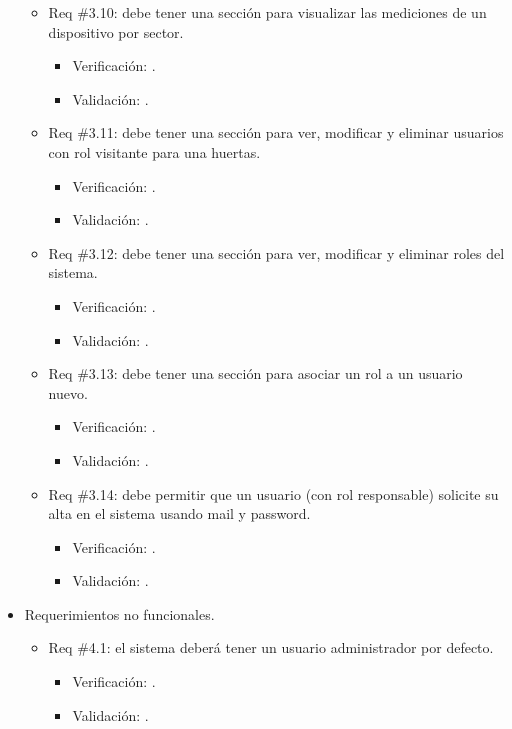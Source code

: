 \documentclass[
11pt, %
codirector, %
]{charter}
\begin{document}
\begin{itemize}
\begin{itemize}
	\item Req \#3.10: debe tener una sección para visualizar las mediciones de un dispositivo por sector.
		\begin{itemize}
		\item Verificación: .
		\item Validación: .\\
		\end{itemize}
		
	\item Req \#3.11: debe tener una sección para ver, modificar y eliminar usuarios con rol visitante para una huertas.
		\begin{itemize}
		\item Verificación: .
		\item Validación: .\\
		\end{itemize}
		
	\item Req \#3.12: debe tener una sección para ver, modificar y eliminar roles del sistema.
		\begin{itemize}
		\item Verificación: .
		\item Validación: .\\
		\end{itemize}
		
	\item Req \#3.13: debe tener una sección para asociar un rol a un usuario nuevo.
		\begin{itemize}
		\item Verificación: .
		\item Validación: .\\
		\end{itemize}
		
	\item Req \#3.14: debe permitir que un usuario (con rol responsable) solicite su alta en el sistema usando mail y password.
		\begin{itemize}
		\item Verificación: .
		\item Validación: .\\
		\end{itemize}
		
\end{itemize}		
		
\item Requerimientos no funcionales.
	\begin{itemize}
	\item Req \#4.1: el sistema deberá tener un usuario administrador por defecto.
		\begin{itemize}
		\item Verificación: .
		\item Validación: .\\  
		\end{itemize}
		

\end{itemize}
\end{itemize}
\end{document}
